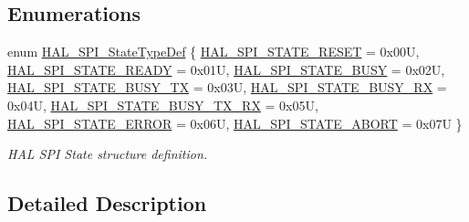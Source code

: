 \subsection*{Enumerations}
\begin{DoxyCompactItemize}
\item 
enum \hyperlink{group___s_p_i___exported___types_ga8891cb64e76198a860172d94c638c9b4}{H\+A\+L\+\_\+\+S\+P\+I\+\_\+\+State\+Type\+Def} \{ \newline
\hyperlink{group___s_p_i___exported___types_gga8891cb64e76198a860172d94c638c9b4adbc218df2c9841b561282b40b3ded69d}{H\+A\+L\+\_\+\+S\+P\+I\+\_\+\+S\+T\+A\+T\+E\+\_\+\+R\+E\+S\+ET} = 0x00U, 
\hyperlink{group___s_p_i___exported___types_gga8891cb64e76198a860172d94c638c9b4abb3992c67a15c14bd1808ef6b63fa926}{H\+A\+L\+\_\+\+S\+P\+I\+\_\+\+S\+T\+A\+T\+E\+\_\+\+R\+E\+A\+DY} = 0x01U, 
\hyperlink{group___s_p_i___exported___types_gga8891cb64e76198a860172d94c638c9b4a0635e168bc0430253fe8e74cfe9768fd}{H\+A\+L\+\_\+\+S\+P\+I\+\_\+\+S\+T\+A\+T\+E\+\_\+\+B\+U\+SY} = 0x02U, 
\hyperlink{group___s_p_i___exported___types_gga8891cb64e76198a860172d94c638c9b4a5d82b644c7ca656ab5fe8a8e3cbc29ab}{H\+A\+L\+\_\+\+S\+P\+I\+\_\+\+S\+T\+A\+T\+E\+\_\+\+B\+U\+S\+Y\+\_\+\+TX} = 0x03U, 
\newline
\hyperlink{group___s_p_i___exported___types_gga8891cb64e76198a860172d94c638c9b4afd7e00128aca1feaa099c2595ffb9277}{H\+A\+L\+\_\+\+S\+P\+I\+\_\+\+S\+T\+A\+T\+E\+\_\+\+B\+U\+S\+Y\+\_\+\+RX} = 0x04U, 
\hyperlink{group___s_p_i___exported___types_gga8891cb64e76198a860172d94c638c9b4a9dae2883ae3e43ca28afc9453a14c938}{H\+A\+L\+\_\+\+S\+P\+I\+\_\+\+S\+T\+A\+T\+E\+\_\+\+B\+U\+S\+Y\+\_\+\+T\+X\+\_\+\+RX} = 0x05U, 
\hyperlink{group___s_p_i___exported___types_gga8891cb64e76198a860172d94c638c9b4a3cba266d2346abe3b62fa0acccab4711}{H\+A\+L\+\_\+\+S\+P\+I\+\_\+\+S\+T\+A\+T\+E\+\_\+\+E\+R\+R\+OR} = 0x06U, 
\hyperlink{group___s_p_i___exported___types_gga8891cb64e76198a860172d94c638c9b4a34f9231d040d752a034db85e3eb7f782}{H\+A\+L\+\_\+\+S\+P\+I\+\_\+\+S\+T\+A\+T\+E\+\_\+\+A\+B\+O\+RT} = 0x07U
 \}\begin{DoxyCompactList}\small\item\em H\+AL S\+PI State structure definition. \end{DoxyCompactList}
\end{DoxyCompactItemize}


\subsection{Detailed Description}


